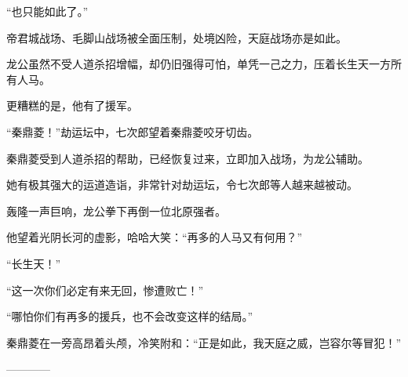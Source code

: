 \begin{this_body}
“也只能如此了。”

帝君城战场、毛脚山战场被全面压制，处境凶险，天庭战场亦是如此。

龙公虽然不受人道杀招增幅，却仍旧强得可怕，单凭一己之力，压着长生天一方所有人马。

更糟糕的是，他有了援军。

“秦鼎菱！”劫运坛中，七次郎望着秦鼎菱咬牙切齿。

秦鼎菱受到人道杀招的帮助，已经恢复过来，立即加入战场，为龙公辅助。

她有极其强大的运道造诣，非常针对劫运坛，令七次郎等人越来越被动。

轰隆一声巨响，龙公拳下再倒一位北原强者。

他望着光阴长河的虚影，哈哈大笑：“再多的人马又有何用？”

“长生天！”

“这一次你们必定有来无回，惨遭败亡！”

“哪怕你们有再多的援兵，也不会改变这样的结局。”

秦鼎菱在一旁高昂着头颅，冷笑附和：“正是如此，我天庭之威，岂容尔等冒犯！”

------------

\end{this_body}

